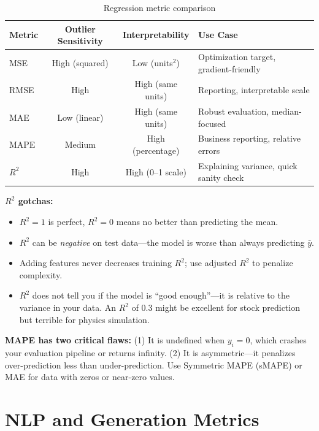 \begin{table}[H]
\centering
\caption{Regression metric comparison}
\begin{tabularx}{\textwidth}{lccX}
\toprule
\textbf{Metric} & \textbf{Outlier Sensitivity} & \textbf{Interpretability} & \textbf{Use Case} \\
\midrule
MSE & High (squared) & Low (units$^2$) & Optimization target, gradient-friendly \\
RMSE & High & High (same units) & Reporting, interpretable scale \\
MAE & Low (linear) & High (same units) & Robust evaluation, median-focused \\
MAPE & Medium & High (percentage) & Business reporting, relative errors \\
$R^2$ & High & High (0--1 scale) & Explaining variance, quick sanity check \\
\bottomrule
\end{tabularx}
\end{table}

\textbf{$R^2$ gotchas:}
\begin{itemize}
    \item $R^2 = 1$ is perfect, $R^2 = 0$ means no better than predicting the mean.
    \item $R^2$ can be \textit{negative} on test data---the model is worse than always predicting $\bar{y}$.
    \item Adding features never decreases training $R^2$; use adjusted $R^2$ to penalize complexity.
    \item $R^2$ does not tell you if the model is ``good enough''---it is relative to the variance in your data. An $R^2$ of 0.3 might be excellent for stock prediction but terrible for physics simulation.
\end{itemize}

\begin{warningbox}
\textbf{MAPE has two critical flaws:} (1) It is undefined when $y_i = 0$, which crashes your evaluation pipeline or returns infinity. (2) It is asymmetric---it penalizes over-prediction less than under-prediction. Use Symmetric MAPE (sMAPE) or MAE for data with zeros or near-zero values.
\end{warningbox}

\section{NLP and Generation Metrics}
\label{sec:nlp_metrics}

